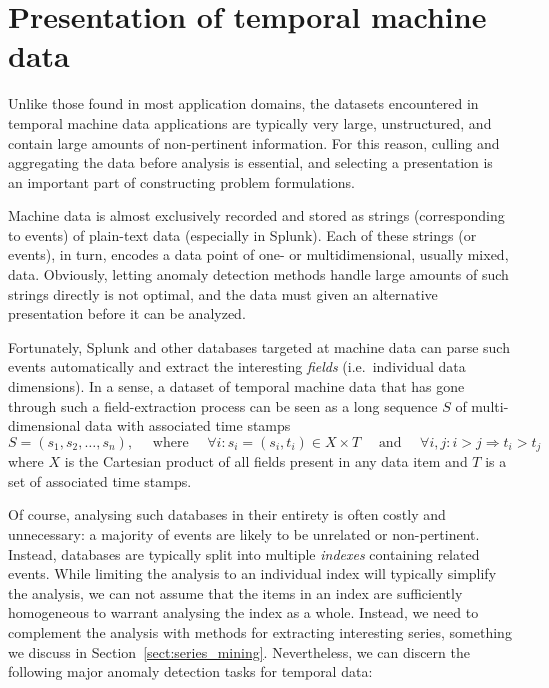 \section{Presentation of temporal machine data}
\label{sect:splunk_techniques}

Unlike those found in most application domains, the datasets encountered in temporal machine data applications are typically very large, unstructured, and contain large amounts of non-pertinent information. For this reason, culling and aggregating the data before analysis is essential, and selecting a presentation is an important part of constructing problem formulations.

Machine data is almost exclusively recorded and stored as strings (corresponding to events) of plain-text data (especially in Splunk). Each of these strings (or events), in turn, encodes a data point of one- or multidimensional, usually mixed, data. Obviously, letting anomaly detection methods handle large amounts of such strings directly is not optimal, and the data must given an alternative presentation before it can be analyzed.

Fortunately, Splunk and other databases targeted at machine data can parse such events automatically and extract the interesting \emph{fields} (i.e.\ individual data dimensions). In a sense, a dataset of temporal machine data that has gone through such a field-extraction process can be seen as a long sequence $S$ of multi-dimensional data with associated time stamps
\[
  S = (s_1, s_2, \dots, s_n), \quad \text{ where } \quad \forall i: s_i = (s_i, t_i) \in X \times T \quad \text{ and } \quad \forall i,j: i > j \Rightarrow t_i > t_j
\]
where $X$ is the Cartesian product of all fields present in any data item and $T$ is a set of associated time stamps.

Of course, analysing such databases in their entirety is often costly and unnecessary: a majority of events are likely to be unrelated or non-pertinent. Instead, databases are typically split into multiple \emph{indexes} containing related events. While limiting the analysis to an individual index will typically simplify the analysis, we can not assume that the items in an index are sufficiently homogeneous to warrant analysing the index as a whole. Instead, we need to complement the analysis with methods for extracting interesting series, something we discuss in Section~\ref{sect:series_mining}. Nevertheless, we can discern the following major anomaly detection tasks for temporal data:

